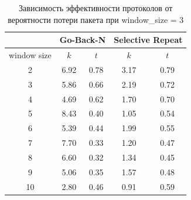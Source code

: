 \begin{table}[H]
	\begin{center}
		\begin{tabular}{|c|c|c|c|c|}
			\hline
			& \multicolumn{2}{c|}{Go-Back-N} & \multicolumn{2}{c|}{Selective Repeat} \\
			\hline
			window size & $k$ & $t$ & $k$ & $t$ \\
			\hline
			2 & 6.92 & 0.78 & 3.17 & 0.79 \\
			\hline
			3 & 5.86 & 0.66 & 2.19 & 0.72\\
			\hline
			4 & 4.69 & 0.62 & 1.70 & 0.70\\
			\hline
			5 & 8.43 & 0.40 & 1.05 & 0.54\\
			\hline
			6 & 5.39 & 0.44 & 1.99 & 0.55\\
			\hline
			7 & 7.70 & 0.33 & 1.20 & 0.47\\
			\hline
			8 & 6.60 & 0.32 & 1.34 & 0.45\\
			\hline
			9 & 5.06 & 0.35 & 1.57 & 0.48\\
			\hline
			10 & 2.80 & 0.46 & 0.91 & 0.59\\
			\hline
		\end{tabular}
		\caption{Зависимость эффективности протоколов от вероятности потери пакета при window\_size = 3}
	\end{center}
\end{table}
